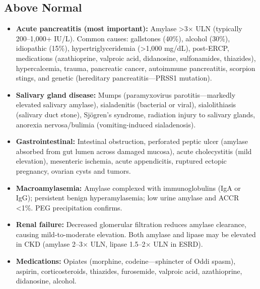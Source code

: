 \subsection*{Above Normal}
\begin{itemize}
  \item \textbf{Acute pancreatitis (most important):} Amylase >3$\times$ ULN (typically 200--1,000+ IU/L). Common causes: gallstones (40\%), alcohol (30\%), idiopathic (15\%), hypertriglyceridemia (>1,000 mg/dL), post-ERCP, medications (azathioprine, valproic acid, didanosine, sulfonamides, thiazides), hypercalcemia, trauma, pancreatic cancer, autoimmune pancreatitis, scorpion stings, and genetic (hereditary pancreatitis---PRSS1 mutation).
  \item \textbf{Salivary gland disease:} Mumps (paramyxovirus parotitis---markedly elevated salivary amylase), sialadenitis (bacterial or viral), sialolithiasis (salivary duct stone), Sj\"{o}gren's syndrome, radiation injury to salivary glands, anorexia nervosa/bulimia (vomiting-induced sialadenosis).
  \item \textbf{Gastrointestinal:} Intestinal obstruction, perforated peptic ulcer (amylase absorbed from gut lumen across damaged mucosa), acute cholecystitis (mild elevation), mesenteric ischemia, acute appendicitis, ruptured ectopic pregnancy, ovarian cysts and tumors.
  \item \textbf{Macroamylasemia:} Amylase complexed with immunoglobulins (IgA or IgG); persistent benign hyperamylasemia; low urine amylase and ACCR <1\%. PEG precipitation confirms.
  \item \textbf{Renal failure:} Decreased glomerular filtration reduces amylase clearance, causing mild-to-moderate elevation. Both amylase and lipase may be elevated in CKD (amylase 2--3$\times$ ULN, lipase 1.5--2$\times$ ULN in ESRD).
  \item \textbf{Medications:} Opiates (morphine, codeine---sphincter of Oddi spasm), aspirin, corticosteroids, thiazides, furosemide, valproic acid, azathioprine, didanosine, alcohol.
\end{itemize}

